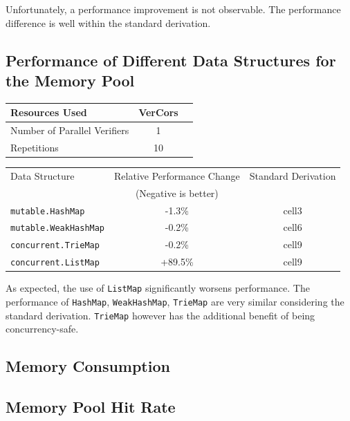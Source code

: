 \documentclass[11pt]{article}
\begin{document}
    Unfortunately, a performance improvement is not observable.
    The performance difference is well within the standard derivation.

    \subsection{Performance of Different Data Structures for the Memory Pool}

    \begin{center}
        \begin{tabular}{ |l|c|c| } 
        \hline
        Resources Used & VerCors \\ 
        \hline
        Number of Parallel Verifiers & 1 \\
        \hline
        Repetitions & 10 \\ 
        \hline
        \end{tabular}
    \end{center}

    \begin{center}
        \begin{tabular}{ |l|c|c| } 
        \hline
        Data Structure & Relative Performance Change & Standard Derivation \\ 
        & (Negative is better) & \\
        \hline
        \texttt{mutable.HashMap} & -1.3\% & cell3 \\ 
        \texttt{mutable.WeakHashMap} & -0.2\% & cell6 \\
        \texttt{concurrent.TrieMap} & -0.2\% & cell9 \\
        \texttt{concurrent.ListMap} & +89.5\% & cell9 \\ 
        \hline
        \end{tabular}
    \end{center}

    As expected, the use of \texttt{ListMap} significantly worsens performance.
    The performance of \texttt{HashMap}, \texttt{WeakHashMap}, \texttt{TrieMap}
    are very similar considering the standard derivation. \texttt{TrieMap} however
    has the additional benefit of being concurrency-safe.

    \subsection{Memory Consumption}

    \subsection{Memory Pool Hit Rate}
\end{document}

